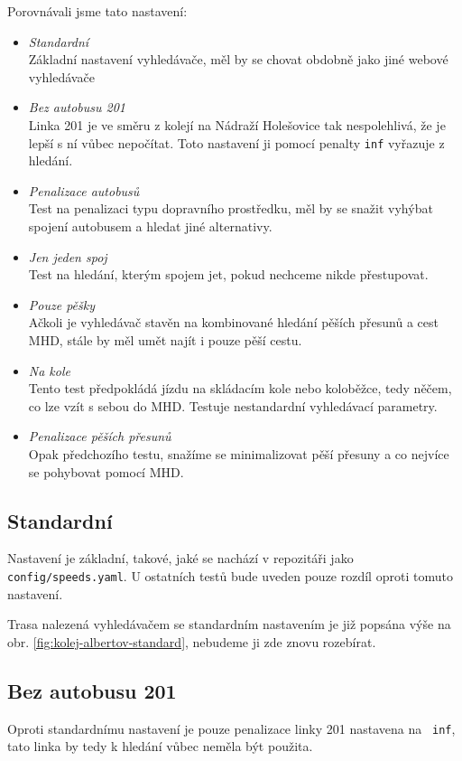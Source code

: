 Porovnávali jsme tato nastavení:
\begin{itemize}
	\item {\em Standardní}\\Základní nastavení vyhledávače, měl by se chovat
	obdobně jako jiné webové vyhledávače
	\item {\em Bez autobusu 201}\\ Linka 201 je ve směru z kolejí na Nádraží
	Holešovice tak nespolehlivá, že je lepší s ní vůbec nepočítat. Toto
	nastavení ji pomocí penalty {\tt inf} vyřazuje z hledání.
	\item {\em Penalizace autobusů}\\ Test na penalizaci typu dopravního
	prostředku, měl by se snažit vyhýbat spojení autobusem a hledat jiné
	alternativy.
	\item {\em Jen jeden spoj}\\ Test na hledání, kterým spojem jet, pokud
	nechceme nikde přestupovat.
	\item {\em Pouze pěšky}\\ Ačkoli je vyhledávač stavěn na kombinované hledání
	pěších přesunů a cest MHD, stále by měl umět najít i pouze pěší cestu.
	\item {\em Na kole}\\ Tento test předpokládá jízdu na skládacím kole nebo
	koloběžce, tedy něčem, co lze vzít s sebou do MHD. Testuje nestandardní
	vyhledávací parametry.
	\item {\em Penalizace pěších přesunů}\\ Opak předchozího testu, snažíme se
	minimalizovat pěší přesuny a co nejvíce se pohybovat pomocí MHD.
\end{itemize}
\subsection{Standardní}
Nastavení je základní, takové, jaké se nachází v repozitáři jako {\tt
config/speeds.yaml}. U ostatních testů bude uveden pouze rozdíl oproti tomuto
nastavení.

Trasa nalezená vyhledávačem se standardním nastavením je již popsána výše na
obr. \ref{fig:kolej-albertov-standard}, nebudeme ji zde znovu rozebírat.
\subsection{Bez autobusu 201}
Oproti standardnímu nastavení je pouze penalizace linky 201 nastavena na {\tt
inf}, tato linka by tedy k hledání vůbec neměla být použita.

